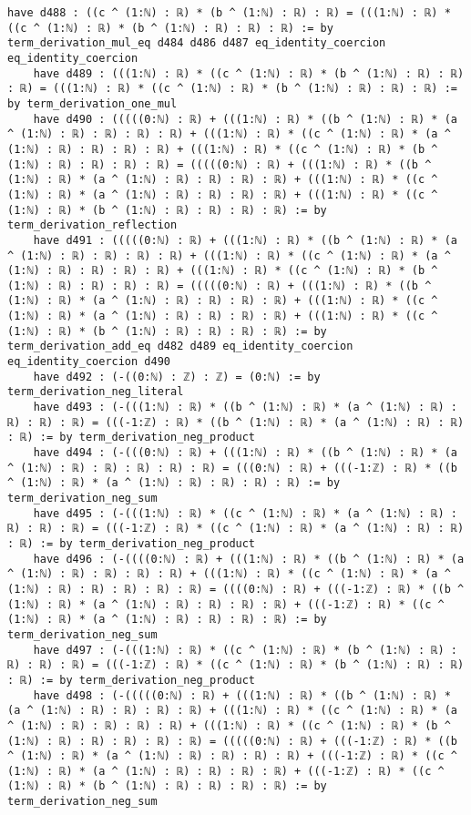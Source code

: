 \documentclass{article}
\begin{document}
\begin{tcolorbox}[colback=white!10, width=\linewidth]
\begin{lstlisting}[language=Lean4]
    have d488 : ((c ^ (1:ℕ) : ℝ) * (b ^ (1:ℕ) : ℝ) : ℝ) = (((1:ℕ) : ℝ) * ((c ^ (1:ℕ) : ℝ) * (b ^ (1:ℕ) : ℝ) : ℝ) : ℝ) := by term_derivation_mul_eq d484 d486 d487 eq_identity_coercion eq_identity_coercion
    have d489 : (((1:ℕ) : ℝ) * ((c ^ (1:ℕ) : ℝ) * (b ^ (1:ℕ) : ℝ) : ℝ) : ℝ) = (((1:ℕ) : ℝ) * ((c ^ (1:ℕ) : ℝ) * (b ^ (1:ℕ) : ℝ) : ℝ) : ℝ) := by term_derivation_one_mul
    have d490 : (((((0:ℕ) : ℝ) + (((1:ℕ) : ℝ) * ((b ^ (1:ℕ) : ℝ) * (a ^ (1:ℕ) : ℝ) : ℝ) : ℝ) : ℝ) + (((1:ℕ) : ℝ) * ((c ^ (1:ℕ) : ℝ) * (a ^ (1:ℕ) : ℝ) : ℝ) : ℝ) : ℝ) + (((1:ℕ) : ℝ) * ((c ^ (1:ℕ) : ℝ) * (b ^ (1:ℕ) : ℝ) : ℝ) : ℝ) : ℝ) = (((((0:ℕ) : ℝ) + (((1:ℕ) : ℝ) * ((b ^ (1:ℕ) : ℝ) * (a ^ (1:ℕ) : ℝ) : ℝ) : ℝ) : ℝ) + (((1:ℕ) : ℝ) * ((c ^ (1:ℕ) : ℝ) * (a ^ (1:ℕ) : ℝ) : ℝ) : ℝ) : ℝ) + (((1:ℕ) : ℝ) * ((c ^ (1:ℕ) : ℝ) * (b ^ (1:ℕ) : ℝ) : ℝ) : ℝ) : ℝ) := by term_derivation_reflection
    have d491 : (((((0:ℕ) : ℝ) + (((1:ℕ) : ℝ) * ((b ^ (1:ℕ) : ℝ) * (a ^ (1:ℕ) : ℝ) : ℝ) : ℝ) : ℝ) + (((1:ℕ) : ℝ) * ((c ^ (1:ℕ) : ℝ) * (a ^ (1:ℕ) : ℝ) : ℝ) : ℝ) : ℝ) + (((1:ℕ) : ℝ) * ((c ^ (1:ℕ) : ℝ) * (b ^ (1:ℕ) : ℝ) : ℝ) : ℝ) : ℝ) = (((((0:ℕ) : ℝ) + (((1:ℕ) : ℝ) * ((b ^ (1:ℕ) : ℝ) * (a ^ (1:ℕ) : ℝ) : ℝ) : ℝ) : ℝ) + (((1:ℕ) : ℝ) * ((c ^ (1:ℕ) : ℝ) * (a ^ (1:ℕ) : ℝ) : ℝ) : ℝ) : ℝ) + (((1:ℕ) : ℝ) * ((c ^ (1:ℕ) : ℝ) * (b ^ (1:ℕ) : ℝ) : ℝ) : ℝ) : ℝ) := by term_derivation_add_eq d482 d489 eq_identity_coercion eq_identity_coercion d490
    have d492 : (-((0:ℕ) : ℤ) : ℤ) = (0:ℕ) := by term_derivation_neg_literal
    have d493 : (-(((1:ℕ) : ℝ) * ((b ^ (1:ℕ) : ℝ) * (a ^ (1:ℕ) : ℝ) : ℝ) : ℝ) : ℝ) = (((-1:ℤ) : ℝ) * ((b ^ (1:ℕ) : ℝ) * (a ^ (1:ℕ) : ℝ) : ℝ) : ℝ) := by term_derivation_neg_product
    have d494 : (-(((0:ℕ) : ℝ) + (((1:ℕ) : ℝ) * ((b ^ (1:ℕ) : ℝ) * (a ^ (1:ℕ) : ℝ) : ℝ) : ℝ) : ℝ) : ℝ) = (((0:ℕ) : ℝ) + (((-1:ℤ) : ℝ) * ((b ^ (1:ℕ) : ℝ) * (a ^ (1:ℕ) : ℝ) : ℝ) : ℝ) : ℝ) := by term_derivation_neg_sum
    have d495 : (-(((1:ℕ) : ℝ) * ((c ^ (1:ℕ) : ℝ) * (a ^ (1:ℕ) : ℝ) : ℝ) : ℝ) : ℝ) = (((-1:ℤ) : ℝ) * ((c ^ (1:ℕ) : ℝ) * (a ^ (1:ℕ) : ℝ) : ℝ) : ℝ) := by term_derivation_neg_product
    have d496 : (-((((0:ℕ) : ℝ) + (((1:ℕ) : ℝ) * ((b ^ (1:ℕ) : ℝ) * (a ^ (1:ℕ) : ℝ) : ℝ) : ℝ) : ℝ) + (((1:ℕ) : ℝ) * ((c ^ (1:ℕ) : ℝ) * (a ^ (1:ℕ) : ℝ) : ℝ) : ℝ) : ℝ) : ℝ) = ((((0:ℕ) : ℝ) + (((-1:ℤ) : ℝ) * ((b ^ (1:ℕ) : ℝ) * (a ^ (1:ℕ) : ℝ) : ℝ) : ℝ) : ℝ) + (((-1:ℤ) : ℝ) * ((c ^ (1:ℕ) : ℝ) * (a ^ (1:ℕ) : ℝ) : ℝ) : ℝ) : ℝ) := by term_derivation_neg_sum
    have d497 : (-(((1:ℕ) : ℝ) * ((c ^ (1:ℕ) : ℝ) * (b ^ (1:ℕ) : ℝ) : ℝ) : ℝ) : ℝ) = (((-1:ℤ) : ℝ) * ((c ^ (1:ℕ) : ℝ) * (b ^ (1:ℕ) : ℝ) : ℝ) : ℝ) := by term_derivation_neg_product
    have d498 : (-(((((0:ℕ) : ℝ) + (((1:ℕ) : ℝ) * ((b ^ (1:ℕ) : ℝ) * (a ^ (1:ℕ) : ℝ) : ℝ) : ℝ) : ℝ) + (((1:ℕ) : ℝ) * ((c ^ (1:ℕ) : ℝ) * (a ^ (1:ℕ) : ℝ) : ℝ) : ℝ) : ℝ) + (((1:ℕ) : ℝ) * ((c ^ (1:ℕ) : ℝ) * (b ^ (1:ℕ) : ℝ) : ℝ) : ℝ) : ℝ) : ℝ) = (((((0:ℕ) : ℝ) + (((-1:ℤ) : ℝ) * ((b ^ (1:ℕ) : ℝ) * (a ^ (1:ℕ) : ℝ) : ℝ) : ℝ) : ℝ) + (((-1:ℤ) : ℝ) * ((c ^ (1:ℕ) : ℝ) * (a ^ (1:ℕ) : ℝ) : ℝ) : ℝ) : ℝ) + (((-1:ℤ) : ℝ) * ((c ^ (1:ℕ) : ℝ) * (b ^ (1:ℕ) : ℝ) : ℝ) : ℝ) : ℝ) := by term_derivation_neg_sum

\end{lstlisting}
\end{tcolorbox}
\end{document}
